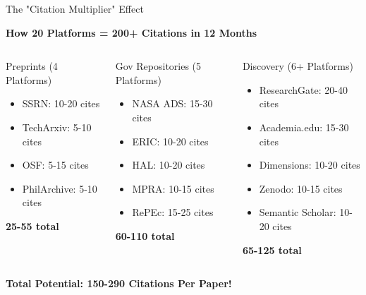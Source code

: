 \documentclass[10pt, aspectratio=169]{beamer}
\begin{document}
	
	\begin{frame}{The "Citation Multiplier" Effect}
		\begin{center}
			\Large{\textbf{How 20 Platforms = 200+ Citations in 12 Months}}
		\end{center}
		
		\vspace{0.3cm}
		\begin{columns}[T]
			\begin{block}{Preprints (4 Platforms)}
				\tiny
				\begin{itemize}
					\item SSRN: 10-20 cites
					\item TechArxiv: 5-10 cites
					\item OSF: 5-15 cites
					\item PhilArchive: 5-10 cites
				\end{itemize}
				\textbf{\textcolor{myblue}{25-55 total}}
			\end{block}
			
			\begin{block}{Gov Repositories (5 Platforms)}
				\tiny
				\begin{itemize}
					\item NASA ADS: 15-30 cites
					\item ERIC: 10-20 cites
					\item HAL: 10-20 cites
					\item MPRA: 10-15 cites
					\item RePEc: 15-25 cites
				\end{itemize}
				\textbf{\textcolor{myblue}{60-110 total}}
			\end{block}
			
			\begin{block}{Discovery (6+ Platforms)}
				\tiny
				\begin{itemize}
					\item ResearchGate: 20-40 cites
					\item Academia.edu: 15-30 cites
					\item Dimensions: 10-20 cites
					\item Zenodo: 10-15 cites
					\item Semantic Scholar: 10-20 cites
				\end{itemize}
				\textbf{\textcolor{myblue}{65-125 total}}
			\end{block}
		\end{columns}
		
		\vspace{0.3cm}
		\begin{center}
			\textcolor{myorange}{\Large \textbf{Total Potential: 150-290 Citations Per Paper!}}
		\end{center}
	\end{frame}
	
\end{document}
